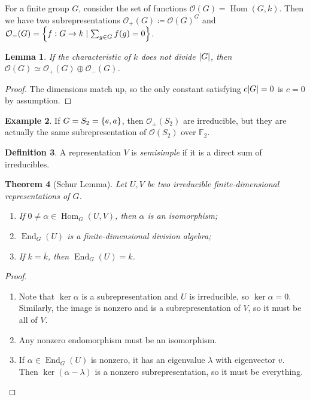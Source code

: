 \documentclass[leqno, openany]{memoir}
\newtheorem{thm}{Theorem}[chapter]
\newtheorem{lem}[thm]{Lemma}
\theoremstyle{definition}
\newtheorem{defn}[thm]{Definition}
\newtheorem{exm}[thm]{Example}
\theoremstyle{remark}
\theoremstyle{plain}
\theoremstyle{definition}
\theoremstyle{remark}
\newcommand{\F}{\mathbb{F}}
\newcommand{\mc}[1]{\mathcal{#1}}
\newcommand{\ol}[1]{\overline{#1}}
\DeclareMathOperator{\Hom}{Hom}
\DeclareMathOperator{\End}{End}
\begin{document}
For a finite group $G$, consider the set of functions $\mc{O}(G) = \Hom(G,k)$.
Then we have two subrepresentations $\mc{O}_+(G) \coloneqq \mc{O}(G)^G$ and
$\mc{O}_-(G) = \qty{f: G \to k \mid \sum_{g \in G} f(g) = 0}$.

\begin{lem} If the characteristic of $k$ does not divide $\abs{G}$, then
$\mc{O}(G) \simeq \mc{O}_+(G) \oplus \mc{O}_-(G)$.  \end{lem}

\begin{proof} The dimensions match up, so the only constant satisfying
$c\abs{G} = 0$ is $c = 0$ by assumption.  \end{proof}

\begin{exm} If $G = S_2 = \qty{e,a}$, then $\mc{O}_{\pm}(S_2)$ are irreducible,
but they are actually the same subrepresentation of $\mc{O}(S_2)$ over $\F_2$.
\end{exm}

\begin{defn} A representation $V$ is \textit{semisimple} if it is a direct sum
of irreducibles.  \end{defn}

\begin{thm}[Schur Lemma] Let $U,V$ be two irreducible finite-dimensional
    representations of $G$.  \begin{enumerate} \item If $0 \neq \alpha \in
        \Hom_G(U,V)$, then $\alpha$ is an isomorphism; \item $\End_G(U)$ is a
        finite-dimensional division algebra; \item If $k = \ol{k}$, then
$\End_G(U) = k$.  \end{enumerate} \end{thm}

\begin{proof} \hfill \begin{enumerate} \item Note that $\ker \alpha$ is a
    subrepresentation and $U$ is irreducible, so $\ker \alpha = 0$. Similarly,
    the image is nonzero and is a subrepresentation of $V$, so it must be all
    of $V$.  \item Any nonzero endomorphism must be an isomorphism.  \item If
    $\alpha \in \End_G(U)$ is nonzero, it has an eigenvalue $\lambda$ with
    eigenvector $v$. Then $\ker(\alpha - \lambda)$ is a nonzero
    subrepresentation, so it must be everything.  \end{enumerate} \end{proof}
\end{document}
